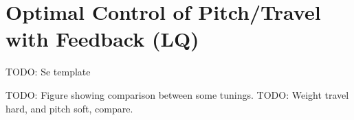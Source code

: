 \section{Optimal Control of Pitch/Travel with Feedback (LQ)}\label{sec:prob3}
TODO: Se template

TODO: Figure showing comparison between some tunings.
TODO: Weight travel hard, and pitch soft, compare.















